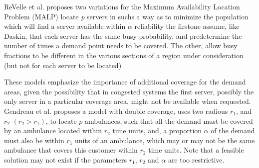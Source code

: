 ReVelle et al. \cite{revelle1989maximum}
proposes two variations for the Maximum Availability Location Problem (MALP)
locate \textit{p} servers
in suchs a way
as to minimize the population
which will find a server available within $\alpha$ reliability
the firstone assume,
like Daskin,
that each server has the same busy probability,
and predetermine the number of times a demand point needs to be covered.
The other,
allow busy fractions
to be different in the various sections of a region under consideration
(but not for each server to be located)

These models
emphasize the importance of additional coverage
for the demand areas,
given the possibility that
in congested systems
the first server,
possibly
the only server in a particular coverage area,
might not be available when requested.
Gendreau et al. \cite{gendreau1997solving}
proposes a model with double coverage,
uses two radious $r_1$, and $r_2$ $(r_2 > r_1)$,
to locate $p$ ambulances,
such that
all the demand must be covered by an ambulance
located within $r_2$ time units,
and,
a proportion $\alpha$ of the demand
must also be within $r_1$ units of an ambulance,
which may or may not be the same ambulance that
covers this customer within $r_2$ time units.
Note that a feasible solution may not exist
if the parameters $r_1$, $r_2$ and $\alpha$ are too restrictive.
